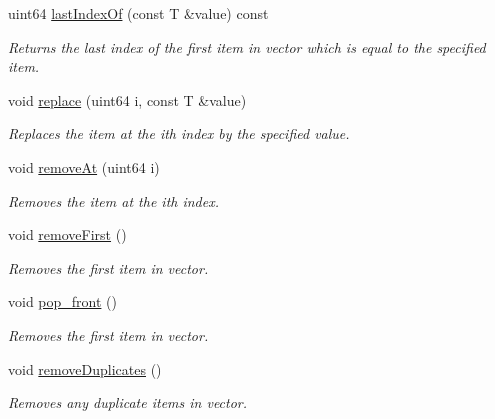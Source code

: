 \begin{DoxyCompactItemize}
uint64 \mbox{\hyperlink{class_a_vector_adcb1b4189e7e270ab8a22fa29ce109ae}{last\+Index\+Of}} (const T \&value) const
\begin{DoxyCompactList}\small\item\em Returns the last index of the first item in vector which is equal to the specified item. \end{DoxyCompactList}\item 
void \mbox{\hyperlink{class_a_vector_ae2ab95fcb42489ddfbf1bfa5a12867a8}{replace}} (uint64 i, const T \&value)
\begin{DoxyCompactList}\small\item\em Replaces the item at the ith index by the specified value. \end{DoxyCompactList}\item 
void \mbox{\hyperlink{class_a_vector_ae3b650535e5a248a385988887064868e}{remove\+At}} (uint64 i)
\begin{DoxyCompactList}\small\item\em Removes the item at the ith index. \end{DoxyCompactList}\item 
\mbox{\label{class_a_vector_a020d395a9f706e2791a3c95f4766cfd8}} 
void \mbox{\hyperlink{class_a_vector_a020d395a9f706e2791a3c95f4766cfd8}{remove\+First}} ()
\begin{DoxyCompactList}\small\item\em Removes the first item in vector. \end{DoxyCompactList}\item 
\mbox{\label{class_a_vector_aff3d2534c69c1402f85cda5b5c145356}} 
void \mbox{\hyperlink{class_a_vector_aff3d2534c69c1402f85cda5b5c145356}{pop\+\_\+front}} ()
\begin{DoxyCompactList}\small\item\em Removes the first item in vector. \end{DoxyCompactList}\item 
\mbox{\label{class_a_vector_aa0d05e2719478e74c93f54e8d7cffc6f}} 
void \mbox{\hyperlink{class_a_vector_aa0d05e2719478e74c93f54e8d7cffc6f}{remove\+Duplicates}} ()
\begin{DoxyCompactList}\small\item\em Removes any duplicate items in vector. \end{DoxyCompactList}\item 

\end{DoxyCompactItemize}
